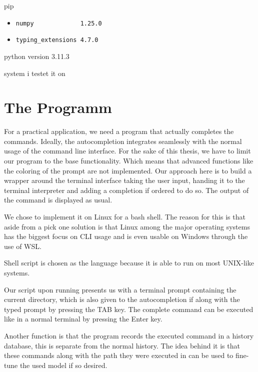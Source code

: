 pip
\begin{itemize}
\item \begin{verbatim}
numpy             1.25.0
\end{verbatim}

\item \begin{verbatim}
typing_extensions 4.7.0
\end{verbatim}
  
\end{itemize}


python version  3.11.3

system i testet it on 

\section{The Programm}
For a practical application, we need a program that actually completes the commands.
Ideally, the autocompletion integrates seamlessly with the normal usage of the command line interface. For the sake of this thesis, we have to limit our program to the base functionality. Which means that advanced functions like the coloring of the prompt are not implemented. Our approach here is to build a wrapper around the terminal interface taking the user input, handing it to the terminal interpreter and adding a completion if ordered to do so. The output of the command is displayed as usual.


We chose to implement it on Linux for a bash shell. The reason for this is that aside from a pick one solution is that Linux among the major operating systems has the biggest focus on CLI usage and is even usable on Windows through the use of WSL.
 

Shell script is chosen as the  language because it is able to run on most UNIX-like systems.


Our script upon running presents us with a terminal prompt containing the current directory, which is also given to the autocompletion if along with the typed prompt by pressing the TAB key. The complete command can be executed like in a normal terminal by pressing the Enter key. 

Another function is that the program records the executed command in a history database, this is separate from the normal history. The idea behind it is that these commands along with the path they were executed in can be used to fine-tune the used model if so desired.


